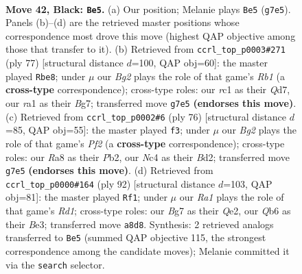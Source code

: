 \documentclass[11pt]{article}
\begin{document}
\clearpage

\begin{figure}[p]\centering
\begin{subfigure}{0.46\textwidth}\centering
\resizebox{\linewidth}{!}{%
\newchessgame
\chessboard[
  setfen={r3k3/6bp/bq2p3/p2p1pB1/P1np1Q1P/8/5P2/RNR1N1K1 b - - 5 42},
  showmover=false,
  pgfstyle=straightmove, color=movearrow, markmove={g7-e5}
]}
\caption{}
\end{subfigure}\hfill
\begin{subfigure}{0.46\textwidth}\centering
\resizebox{\linewidth}{!}{%
\newchessgame
\chessboard[
  setfen={1r5k/3q2b1/p2Prnpp/1p6/3B2p1/PRN2p1P/7Q/3R1B1K b - - 3 39},
  showmover=false,
  pgfstyle=straightmove, color=movearrow, markmove={b8-e8}
]}
\caption{}
\end{subfigure}
\\[4pt]
\begin{subfigure}{0.46\textwidth}\centering
\resizebox{\linewidth}{!}{%
\newchessgame
\chessboard[
  setfen={2r4k/1bn2r1p/p1q1Nnp1/2P1R3/7P/1BQ5/1P1B1PP1/6K1 w - - 3 39},
  showmover=false,
  pgfstyle=straightmove, color=movearrow, markmove={f2-f3}
]}
\caption{}
\end{subfigure}\hfill
\begin{subfigure}{0.46\textwidth}\centering
\resizebox{\linewidth}{!}{%
\newchessgame
\chessboard[
  setfen={4k3/p3b2p/1pnrq1pP/2p5/2P1P1N1/3PB1P1/4Q3/3R2K1 w - - 2 47},
  showmover=false,
  pgfstyle=straightmove, color=movearrow, markmove={d1-f1}
]}
\caption{}
\end{subfigure}
\caption{\textbf{Move 42, Black: \texttt{Be5}.} (a) Our position; Melanie plays \texttt{Be5} (\texttt{g7e5}). Panels (b)--(d) are the retrieved master positions whose correspondence most drove this move (highest QAP objective among those that transfer to it). (b) Retrieved from \texttt{ccrl\_top\_p0003\#271} (ply 77) [structural distance $d$=100, QAP obj=60]: the master played \texttt{Rbe8}; under $\mu$ our \emph{Bg2} plays the role of that game's \emph{Rb1} (a \textbf{cross-type} correspondence); cross-type roles: our \emph{r}c1 as their \emph{Q}d7, our \emph{r}a1 as their \emph{B}g7; transferred move \texttt{g7e5} \textbf{(endorses this move)}. (c) Retrieved from \texttt{ccrl\_top\_p0002\#6} (ply 76) [structural distance $d$=85, QAP obj=55]: the master played \texttt{f3}; under $\mu$ our \emph{Bg2} plays the role of that game's \emph{Pf2} (a \textbf{cross-type} correspondence); cross-type roles: our \emph{R}a8 as their \emph{P}b2, our \emph{N}c4 as their \emph{B}d2; transferred move \texttt{g7e5} \textbf{(endorses this move)}. (d) Retrieved from \texttt{ccrl\_top\_p0000\#164} (ply 92) [structural distance $d$=103, QAP obj=81]: the master played \texttt{Rf1}; under $\mu$ our \emph{Ra1} plays the role of that game's \emph{Rd1}; cross-type roles: our \emph{B}g7 as their \emph{Q}e2, our \emph{Q}b6 as their \emph{B}e3; transferred move \texttt{a8d8}. Synthesis: 2 retrieved analogs transferred to \texttt{Be5} (summed QAP objective 115, the strongest correspondence among the candidate moves); Melanie committed it via the \texttt{search} selector.}
\label{fig:thought-m83}
\end{figure}
\end{document}
